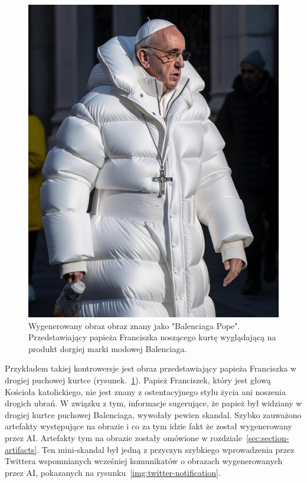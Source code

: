 \begin{figure}
    \includegraphics[width=\linewidth]{img/pope_balenciaga}
    \centering
    \caption{Wygenerowany obraz obraz znany jako "Balenciaga Pope".
    Przedstawiający papieża Franciszka noszącego kurtę wyglądającą na produkt dorgiej marki modowej Balenciaga.}
    \label{img:pope-balenciaga}
\end{figure}

Przykładem takiej kontrowersje jest obraz przedstawiający papieża Franciszka w drogiej puchowej kurtce (rysunek.~\ref{img:pope-balenciaga}).
Papież Franciszek, który jest głową Kościoła katolickiego, nie jest znany z ostentacyjnego stylu życia ani noszenia drogich ubrań.
W związku z tym, informacje sugerujące, że papież był widziany w drogiej kurtce puchowej Balenciaga, wywołały pewien skandal.
Szybko zauważono artefakty występujące na obrazie i co za tym idzie fakt że został wygenerowany przez AI. Artefakty tym na obrazie zostały omówione w rozdziale~\ref{sec:section-artifacts}.
Ten mini-skandal był jedną z przyczyn szybkiego wprowadzenia przez Twittera wspomnianych wcześniej komunikatów o obrazach wygenerowanych przez AI, pokazanych na rysunku~\ref{img:twitter-notification}.



